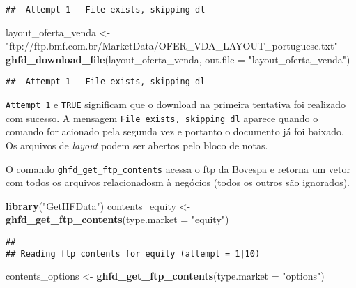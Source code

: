 \documentclass[]{article}
\newenvironment{Shaded}{\begin{snugshade}}{\end{snugshade}}
\newcommand{\KeywordTok}[1]{\textcolor[rgb]{0.13,0.29,0.53}{\textbf{{#1}}}}
\newcommand{\DataTypeTok}[1]{\textcolor[rgb]{0.13,0.29,0.53}{{#1}}}
\newcommand{\StringTok}[1]{\textcolor[rgb]{0.31,0.60,0.02}{{#1}}}
\newcommand{\NormalTok}[1]{{#1}}
\begin{document}
\begin{verbatim}
##  Attempt 1 - File exists, skipping dl
\end{verbatim}

\begin{Shaded}
\begin{Highlighting}[]
\NormalTok{layout_oferta_venda <-}\StringTok{ "ftp://ftp.bmf.com.br/MarketData/OFER_VDA_LAYOUT_portuguese.txt"}
\KeywordTok{ghfd_download_file}\NormalTok{(layout_oferta_venda, }\DataTypeTok{out.file =} \StringTok{"layout_oferta_venda"}\NormalTok{)}
\end{Highlighting}
\end{Shaded}

\begin{verbatim}
##  Attempt 1 - File exists, skipping dl
\end{verbatim}

\texttt{Attempt\ 1} e \texttt{TRUE} significam que o download na
primeira tentativa foi realizado com sucesso. A mensagem
\texttt{File\ exists,\ skipping\ dl} aparece quando o comando for
acionado pela segunda vez e portanto o documento já foi baixado. Os
arquivos de \emph{layout} podem ser abertos pelo bloco de notas.

O comando \texttt{ghfd\_get\_ftp\_contents} acessa o ftp da Bovespa e
retorna um vetor com todos os arquivos relacionadosm à negócios (todos
os outros são ignorados).

\begin{Shaded}
\begin{Highlighting}[]
\KeywordTok{library}\NormalTok{(}\StringTok{"GetHFData"}\NormalTok{)}
\NormalTok{contents_equity <-}\StringTok{ }\KeywordTok{ghfd_get_ftp_contents}\NormalTok{(}\DataTypeTok{type.market =} \StringTok{"equity"}\NormalTok{)}
\end{Highlighting}
\end{Shaded}

\begin{verbatim}
## 
## Reading ftp contents for equity (attempt = 1|10)
\end{verbatim}

\begin{Shaded}
\begin{Highlighting}[]
\NormalTok{contents_options <-}\StringTok{ }\KeywordTok{ghfd_get_ftp_contents}\NormalTok{(}\DataTypeTok{type.market =} \StringTok{"options"}\NormalTok{)}
\end{Highlighting}
\end{Shaded}
\end{document}
